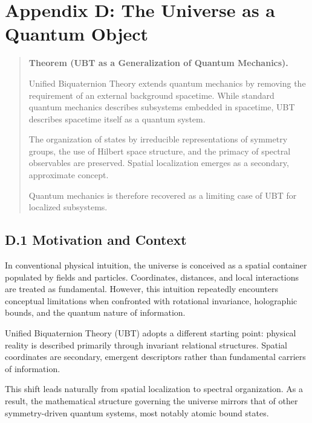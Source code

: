 
\section*{Appendix D: The Universe as a Quantum Object}

\begin{quote}
\textbf{Theorem (UBT as a Generalization of Quantum Mechanics).}

Unified Biquaternion Theory extends quantum mechanics by removing the requirement of an external background spacetime. While standard quantum mechanics describes subsystems embedded in spacetime, UBT describes spacetime itself as a quantum system.

The organization of states by irreducible representations of symmetry groups, the use of Hilbert space structure, and the primacy of spectral observables are preserved. Spatial localization emerges as a secondary, approximate concept.

Quantum mechanics is therefore recovered as a limiting case of UBT for localized subsystems.
\end{quote}

\subsection*{D.1 Motivation and Context}

In conventional physical intuition, the universe is conceived as a spatial container populated by fields and particles. Coordinates, distances, and local interactions are treated as fundamental. However, this intuition repeatedly encounters conceptual limitations when confronted with rotational invariance, holographic bounds, and the quantum nature of information.

Unified Biquaternion Theory (UBT) adopts a different starting point: physical reality is described primarily through invariant relational structures. Spatial coordinates are secondary, emergent descriptors rather than fundamental carriers of information.

This shift leads naturally from spatial localization to spectral organization. As a result, the mathematical structure governing the universe mirrors that of other symmetry-driven quantum systems, most notably atomic bound states.

